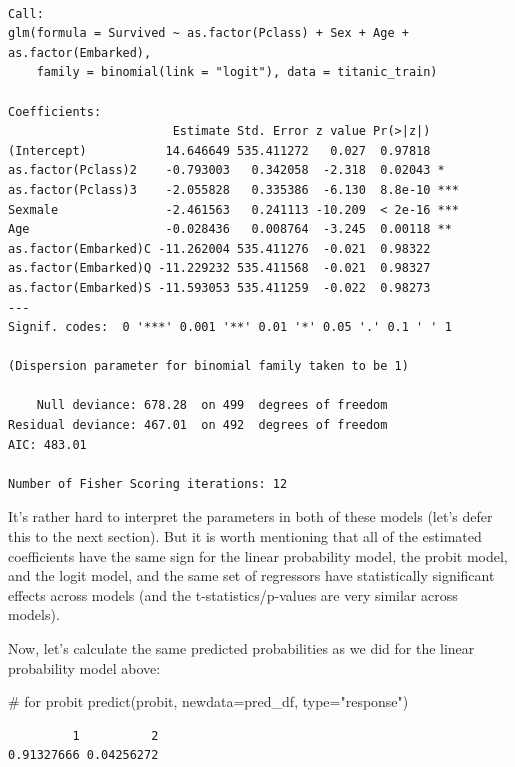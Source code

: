 \documentclass[
  letterpaper,
  DIV=11,
  numbers=noendperiod]{scrreprt}
\newenvironment{Shaded}{\begin{snugshade}}{\end{snugshade}}
\newcommand{\AttributeTok}[1]{\textcolor[rgb]{0.40,0.45,0.13}{#1}}
\newcommand{\CommentTok}[1]{\textcolor[rgb]{0.37,0.37,0.37}{#1}}
\newcommand{\FunctionTok}[1]{\textcolor[rgb]{0.28,0.35,0.67}{#1}}
\newcommand{\NormalTok}[1]{\textcolor[rgb]{0.00,0.23,0.31}{#1}}
\newcommand{\StringTok}[1]{\textcolor[rgb]{0.13,0.47,0.30}{#1}}
\begin{document}
\begin{verbatim}

Call:
glm(formula = Survived ~ as.factor(Pclass) + Sex + Age + as.factor(Embarked), 
    family = binomial(link = "logit"), data = titanic_train)

Coefficients:
                       Estimate Std. Error z value Pr(>|z|)    
(Intercept)           14.646649 535.411272   0.027  0.97818    
as.factor(Pclass)2    -0.793003   0.342058  -2.318  0.02043 *  
as.factor(Pclass)3    -2.055828   0.335386  -6.130  8.8e-10 ***
Sexmale               -2.461563   0.241113 -10.209  < 2e-16 ***
Age                   -0.028436   0.008764  -3.245  0.00118 ** 
as.factor(Embarked)C -11.262004 535.411276  -0.021  0.98322    
as.factor(Embarked)Q -11.229232 535.411568  -0.021  0.98327    
as.factor(Embarked)S -11.593053 535.411259  -0.022  0.98273    
---
Signif. codes:  0 '***' 0.001 '**' 0.01 '*' 0.05 '.' 0.1 ' ' 1

(Dispersion parameter for binomial family taken to be 1)

    Null deviance: 678.28  on 499  degrees of freedom
Residual deviance: 467.01  on 492  degrees of freedom
AIC: 483.01

Number of Fisher Scoring iterations: 12
\end{verbatim}

It's rather hard to interpret the parameters in both of these models
(let's defer this to the next section). But it is worth mentioning that
all of the estimated coefficients have the same sign for the linear
probability model, the probit model, and the logit model, and the same
set of regressors have statistically significant effects across models
(and the t-statistics/p-values are very similar across models).

Now, let's calculate the same predicted probabilities as we did for the
linear probability model above:

\begin{Shaded}
\begin{Highlighting}[]
\CommentTok{\# for probit}
\FunctionTok{predict}\NormalTok{(probit, }\AttributeTok{newdata=}\NormalTok{pred\_df, }\AttributeTok{type=}\StringTok{"response"}\NormalTok{)}
\end{Highlighting}
\end{Shaded}

\begin{verbatim}
         1          2 
0.91327666 0.04256272 
\end{verbatim}
\end{document}
